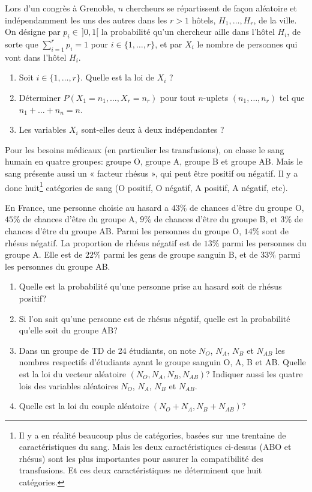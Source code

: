 \documentclass[a4paper,12pt,reqno]{amsart}
\begin{document}
\begin{exo}

  Lors d'un congrès à Grenoble, $n$ chercheurs se répartissent de façon aléatoire et indépendamment les uns des autres dans les $r > 1$ hôtels, $H_1,\ldots,H_r$, de la ville. On désigne par $p_i \in\, ]0,1[$ la probabilité qu'un chercheur aille dans l'hôtel $H_i$, de sorte que $\sum_{i=1}^rp_i=1$ pour $i\in\{1,\ldots,r\}$, et par $X_i$ le nombre de personnes qui vont dans l'hôtel $H_i$.
  \begin{enumerate}
    \item Soit $i\in\{1,\ldots,r\}$. Quelle est la loi de $X_i$ ?
    \item Déterminer  $P(X_1=n_1,\ldots,X_r=n_r)$ pour tout $n$-uplets $(n_1,\ldots,n_r)$ tel que $n_1+\ldots +n_n=n$.
    \item Les variables $X_i$ sont-elles deux à deux indépendantes ?
  \end{enumerate}

\end{exo}

\begin{exo}

  Pour les besoins médicaux (en particulier les transfusions), on classe le sang humain en quatre groupes: groupe O, groupe A, groupe B et groupe AB. Mais le sang présente aussi un « facteur rhésus », qui peut être positif ou négatif. Il y a donc huit\footnote{Il y a en réalité beaucoup plus de catégories, basées sur une trentaine de caractéristiques du sang. Mais les deux caractéristiques ci-dessus (ABO et rhésus) sont les plus importantes pour assurer la compatibilité des transfusions. Et ces deux caractéristiques ne déterminent que huit catégories.} catégories de sang (O positif, O négatif, A positif, A négatif, etc).

  En France, une personne choisie au hasard a $43\%$ de chances d'être du groupe O, $45\%$ de chances d'être du groupe A, $9\%$ de chances d'être du groupe B, et $3\%$ de chances d'être du groupe AB. Parmi les personnes du groupe O, $14\%$ sont de rhésus négatif. La proportion de rhésus négatif est de $13\%$ parmi les personnes du groupe A. Elle est de $22\%$ parmi les gens de groupe sanguin B, et de $33\%$ parmi les personnes du groupe AB.
  \begin{enumerate}
    \item Quelle est la probabilité qu'une personne prise au hasard soit de rhésus positif?
    \item Si l'on sait qu'une personne est de rhésus négatif, quelle est la probabilité qu'elle soit du groupe AB?
    \item Dans un groupe de TD de 24 étudiants, on note $N_O$, $N_A$, $N_B$ et $N_{AB}$ les nombres respectifs d'étudiants ayant le groupe sanguin O, A, B et AB. Quelle est la loi du vecteur aléatoire  $(N_O,N_A,N_B,N_{AB})$? Indiquer aussi les quatre lois des variables aléatoires $N_O$, $N_A$, $N_B$ et $N_{AB}$.
    \item Quelle est la loi du couple aléatoire $(N_O+N_A,N_B+N_{AB})$?
  \end{enumerate}
\end{exo}
\end{document}

